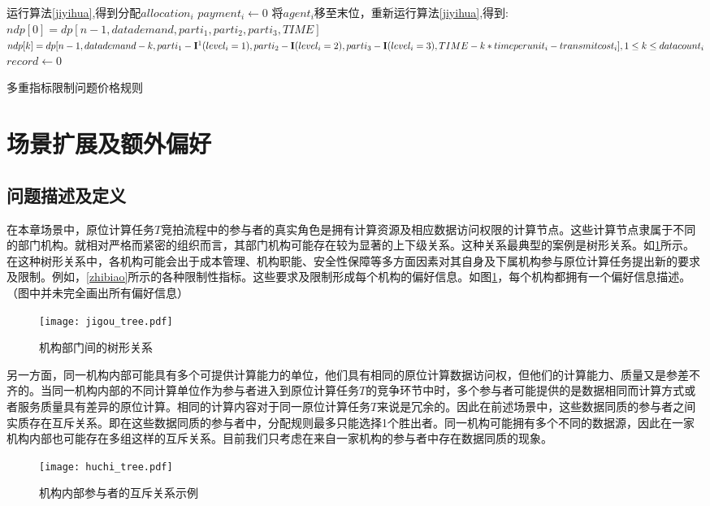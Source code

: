 \documentclass[promaster]{thesis-uestc}
\begin{document}
\begin{algorithm}[H]
    运行算法\ref{jiyihua},得到分配$allocation_i$\;
    {
        $payment_i \leftarrow 0$\;
        将$agent_i$移至末位，重新运行算法\ref{jiyihua},得到:\;
        $ndp[0] = dp[n-1,datademand,parti_1,parti_2,parti_3,TIME]$\;
        $ndp[k] = dp[n-1,datademand-k,parti_1-\mathbf{I\footnotemark}(level_i=1),parti_2-\mathbf{I}(level_i=2),parti_3-\mathbf{I}(level_i=3),TIME-k*timeperunit_i-transmitcost_i],1\leq k\leq datacount_i$\;
        $record \leftarrow 0$\;
    }
\caption{多重指标限制问题价格规则}
\label{dp_zhifu}
\end{algorithm}

\section{场景扩展及额外偏好}
\subsection{问题描述及定义}
在本章场景中，原位计算任务$T$竞拍流程中的参与者的真实角色是拥有计算资源及相应数据访问权限的计算节点。这些计算节点隶属于不同的部门机构。就相对严格而紧密的组织而言，其部门机构可能存在较为显著的上下级关系。这种关系最典型的案例是树形关系。如\ref{jigoushu}所示。在这种树形关系中，各机构可能会出于成本管理、机构职能、安全性保障等多方面因素对其自身及下属机构参与原位计算任务提出新的要求及限制。例如，\ref{zhibiao}所示的各种限制性指标。这些要求及限制形成每个机构的偏好信息。如图\ref{jigoushu}，每个机构都拥有一个偏好信息描述。（图中并未完全画出所有偏好信息）

\begin{figure}[h]
\center
    \texttt{[image: jigou\_tree.pdf]}
    \caption{机构部门间的树形关系}
    \label{jigoushu}
\end{figure}

另一方面，同一机构内部可能具有多个可提供计算能力的单位，他们具有相同的原位计算数据访问权，但他们的计算能力、质量又是参差不齐的。当同一机构内部的不同计算单位作为参与者进入到原位计算任务$T$的竞争环节中时，多个参与者可能提供的是数据相同而计算方式或者服务质量具有差异的原位计算。相同的计算内容对于同一原位计算任务$T$来说是冗余的。因此在前述场景中，这些数据同质的参与者之间实质存在互斥关系。即在这些数据同质的参与者中，分配规则最多只能选择1个胜出者。同一机构可能拥有多个不同的数据源，因此在一家机构内部也可能存在多组这样的互斥关系。目前我们只考虑在来自一家机构的参与者中存在数据同质的现象。
\begin{figure}[h]
    \texttt{[image: huchi\_tree.pdf]}
    \caption{机构内部参与者的互斥关系示例}
    \label{huchishu}
\end{figure}
\end{document}
